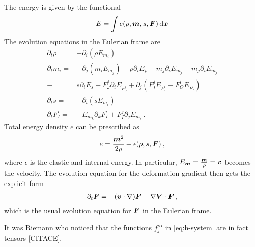 \begin{example}
    The energy is given by the functional
    \begin{align}
        E = \int e(\rho, \boldsymbol{m}, s, \boldsymbol{F}) \, \mathrm{d} \boldsymbol{x}
    \end{align}
    The evolution equations in the Eulerian frame are
    \begin{align}
        \partial_t \rho =& - \partial_i (\rho E_{m_i}) 
        \\
        \partial_t m_i =& - \partial_j(m_i E_{m_j}) - \rho \partial_i E_\rho - m_j \partial_i E_{m_j} - m_j \partial_i E_{m_j} 
        \\
        -& s \partial_i E_s - F^j_J \partial_i E_{F^j_J} + \partial_j(F^j_I E_{F^i_I} + F^i_O E_{F^i_I}) 
        \\
        \partial_t s =& - \partial_i (sE_{m_i})
        \\
        \partial_t F^i_I =& - E_{m_k} \partial_k F^i_I + F^j_I \partial_j E_{m_i} \:.
    \end{align}
    Total energy density $e$ can be prescribed as
    \begin{align}
        e = \frac{\boldsymbol{m}^2}{2 \rho} + \epsilon(\rho,s , \boldsymbol{F}) \:,
    \end{align}
    where $\epsilon$ is the elastic and internal energy. In particular, $E_{\boldsymbol{m}} = \frac{\boldsymbol{m}}{\rho} = \boldsymbol{v}$ becomes the velocity. The evolution equation for the deformation gradient then gets the explicit form
    \begin{align}
        \partial_t \boldsymbol{F} = -(\boldsymbol{v} \cdot \nabla) \boldsymbol{F} + \nabla \boldsymbol{V} \cdot \boldsymbol{F} \:,
    \end{align}
    which is the usual evolution equation for $\boldsymbol{F}$ in the Eulerian frame.
\end{example}

It was Riemann who noticed that the functions $f^{i \alpha}_j$ in \eqref{eq:h-system} are in fact tensors [CITACE]\cite{Dubrovin-Novikov}.

